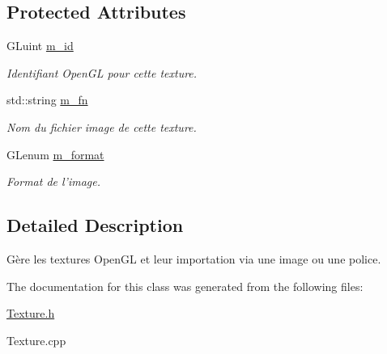 \subsection*{Protected Attributes}
\begin{DoxyCompactItemize}
\item 
\hypertarget{classTexture_acc091a7a07abe75c263544eaeec44664}{G\+Luint \hyperlink{classTexture_acc091a7a07abe75c263544eaeec44664}{m\+\_\+id}}\label{classTexture_acc091a7a07abe75c263544eaeec44664}

\begin{DoxyCompactList}\small\item\em Identifiant Open\+G\+L pour cette texture. \end{DoxyCompactList}\item 
\hypertarget{classTexture_a9a0d5c5fadadbca3595e46958cc88838}{std\+::string \hyperlink{classTexture_a9a0d5c5fadadbca3595e46958cc88838}{m\+\_\+fn}}\label{classTexture_a9a0d5c5fadadbca3595e46958cc88838}

\begin{DoxyCompactList}\small\item\em Nom du fichier image de cette texture. \end{DoxyCompactList}\item 
\hypertarget{classTexture_a00dc4aaa74b0e979f4f7be844a349c62}{G\+Lenum \hyperlink{classTexture_a00dc4aaa74b0e979f4f7be844a349c62}{m\+\_\+format}}\label{classTexture_a00dc4aaa74b0e979f4f7be844a349c62}

\begin{DoxyCompactList}\small\item\em Format de l'image. \end{DoxyCompactList}\end{DoxyCompactItemize}


\subsection{Detailed Description}
Gère les textures Open\+G\+L et leur importation via une image ou une police. 

The documentation for this class was generated from the following files\+:\begin{DoxyCompactItemize}
\item 
\hyperlink{Texture_8h}{Texture.\+h}\item 
Texture.\+cpp\end{DoxyCompactItemize}
